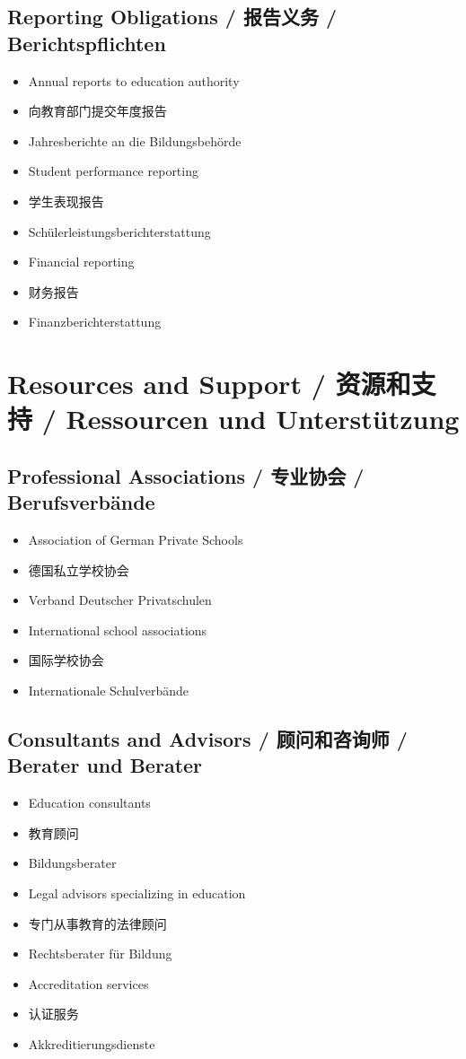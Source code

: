 \subsection{Reporting Obligations / 报告义务 / Berichtspflichten}
\begin{itemize}
    \item Annual reports to education authority
    \item 向教育部门提交年度报告
    \item Jahresberichte an die Bildungsbehörde
    \item Student performance reporting
    \item 学生表现报告
    \item Schülerleistungsberichterstattung
    \item Financial reporting
    \item 财务报告
    \item Finanzberichterstattung
\end{itemize}

\section{Resources and Support / 资源和支持 / Ressourcen und Unterstützung}

\subsection{Professional Associations / 专业协会 / Berufsverbände}
\begin{itemize}
    \item Association of German Private Schools
    \item 德国私立学校协会
    \item Verband Deutscher Privatschulen
    \item International school associations
    \item 国际学校协会
    \item Internationale Schulverbände
\end{itemize}

\subsection{Consultants and Advisors / 顾问和咨询师 / Berater und Berater}
\begin{itemize}
    \item Education consultants
    \item 教育顾问
    \item Bildungsberater
    \item Legal advisors specializing in education
    \item 专门从事教育的法律顾问
    \item Rechtsberater für Bildung
    \item Accreditation services
    \item 认证服务
    \item Akkreditierungsdienste
\end{itemize}

